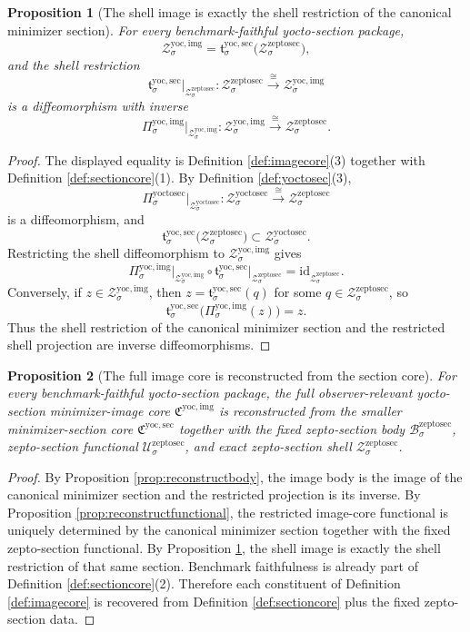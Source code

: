 \documentclass[11pt]{article}
\newcommand{\ZeptoSectionBody}[1]{\mathcal B_{#1}^{\mathrm{zeptosec}}}
\newcommand{\ZeptoSectionFunctional}[1]{\mathscr U_{#1}^{\mathrm{zeptosec}}}
\newcommand{\ZeptoSectionShell}[1]{\mathcal Z_{#1}^{\mathrm{zeptosec}}}
\newcommand{\YoctoSectionProj}[1]{\Pi_{#1}^{\mathrm{yoctosec}}}
\newcommand{\YoctoSectionShell}[1]{\mathcal Z_{#1}^{\mathrm{yoctosec}}}
\newcommand{\YoctoImageCore}{\mathfrak C^{\mathrm{yoc,img}}}
\newcommand{\YoctoImgProj}[1]{\Pi_{#1}^{\mathrm{yoc,img}}}
\newcommand{\YoctoImgShell}[1]{\mathcal Z_{#1}^{\mathrm{yoc,img}}}
\newcommand{\YoctoMinSectionCore}{\mathfrak C^{\mathrm{yoc,sec}}}
\newcommand{\YoctoMinSection}[1]{\mathfrak t_{#1}^{\mathrm{yoc,sec}}}
\newtheorem{proposition}{Proposition}
\begin{document}
\begin{proposition}[The shell image is exactly the shell restriction of the canonical minimizer section]
\label{prop:reconstructshell}
For every benchmark-faithful yocto-section package,
\[
\YoctoImgShell{\sigma}
=
\YoctoMinSection{\sigma}\bigl(\ZeptoSectionShell{\sigma}\bigr),
\]
and the shell restriction
\[
\YoctoMinSection{\sigma}\big|_{\ZeptoSectionShell{\sigma}}
:
\ZeptoSectionShell{\sigma}\xrightarrow{\cong}\YoctoImgShell{\sigma}
\]
is a diffeomorphism with inverse
\[
\YoctoImgProj{\sigma}\big|_{\YoctoImgShell{\sigma}}
:
\YoctoImgShell{\sigma}\xrightarrow{\cong}\ZeptoSectionShell{\sigma}.
\]
\end{proposition}

\begin{proof}
The displayed equality is Definition \ref{def:imagecore}(3) together with Definition \ref{def:sectioncore}(1). By Definition \ref{def:yoctosec}(3),
\[
\YoctoSectionProj{\sigma}\big|_{\YoctoSectionShell{\sigma}}
:
\YoctoSectionShell{\sigma}\xrightarrow{\cong}\ZeptoSectionShell{\sigma}
\]
is a diffeomorphism, and
\[
\YoctoMinSection{\sigma}\bigl(\ZeptoSectionShell{\sigma}\bigr)
\subset
\YoctoSectionShell{\sigma}.
\]
Restricting the shell diffeomorphism to \(\YoctoImgShell{\sigma}\) gives
\[
\YoctoImgProj{\sigma}\big|_{\YoctoImgShell{\sigma}}
\circ
\YoctoMinSection{\sigma}\big|_{\ZeptoSectionShell{\sigma}}
=
\mathrm{id}_{\ZeptoSectionShell{\sigma}}.
\]
Conversely, if \(z\in\YoctoImgShell{\sigma}\), then \(z=\YoctoMinSection{\sigma}(q)\) for some \(q\in\ZeptoSectionShell{\sigma}\), so
\[
\YoctoMinSection{\sigma}\bigl(\YoctoImgProj{\sigma}(z)\bigr)
=
z.
\]
Thus the shell restriction of the canonical minimizer section and the restricted shell projection are inverse diffeomorphisms.
\end{proof}

\begin{proposition}[The full image core is reconstructed from the section core]
\label{prop:reconstructimage}
For every benchmark-faithful yocto-section package, the full observer-relevant yocto-section minimizer-image core \(\YoctoImageCore\) is reconstructed from the smaller minimizer-section core \(\YoctoMinSectionCore\) together with the fixed zepto-section body \(\ZeptoSectionBody{\sigma}\), zepto-section functional \(\ZeptoSectionFunctional{\sigma}\), and exact zepto-section shell \(\ZeptoSectionShell{\sigma}\).
\end{proposition}

\begin{proof}
By Proposition \ref{prop:reconstructbody}, the image body is the image of the canonical minimizer section and the restricted projection is its inverse. By Proposition \ref{prop:reconstructfunctional}, the restricted image-core functional is uniquely determined by the canonical minimizer section together with the fixed zepto-section functional. By Proposition \ref{prop:reconstructshell}, the shell image is exactly the shell restriction of that same section. Benchmark faithfulness is already part of Definition \ref{def:sectioncore}(2). Therefore each constituent of Definition \ref{def:imagecore} is recovered from Definition \ref{def:sectioncore} plus the fixed zepto-section data.
\end{proof}
\end{document}
